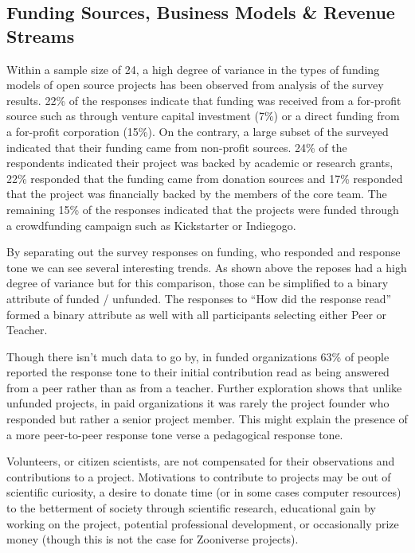 \subsection{Funding Sources, Business Models \& Revenue Streams}

Within a sample size of 24, a high degree of variance in the types of funding models of open source projects has been observed from analysis of the survey results. 22\% of the responses indicate that funding was received from a for-profit source such as through venture capital investment (7\%) or a direct funding from a for-profit corporation (15\%). On the contrary, a large subset of the surveyed indicated that their funding came from non-profit sources. 24\% of the respondents indicated their project was backed by academic or research grants, 22\% responded that the funding came from donation sources and 17\% responded that the project was financially backed by the members of the core team. The remaining 15\% of the responses indicated that the projects were funded through a crowdfunding campaign such as Kickstarter or Indiegogo.




By separating out the survey responses on funding, who responded and response tone we can see several interesting trends. As shown above the reposes had a high degree of variance but for this comparison, those can be simplified to a binary attribute of funded / unfunded. The responses to “How did the response read” formed a binary attribute as well with all participants selecting either Peer or Teacher.

Though there isn't much data to go by, in funded organizations 63\% of people reported the response tone to their initial contribution read as being answered from a peer rather than as from a teacher. Further exploration shows that unlike unfunded projects, in paid organizations it was rarely the project founder who responded but rather a senior project member. This might explain the presence of a more peer-to-peer response tone verse a pedagogical response tone.


Volunteers, or citizen scientists, are not compensated for their observations and contributions to a project. Motivations to contribute to projects may be out of scientific curiosity, a desire to donate time (or in some cases computer resources) to the betterment of society through scientific research, educational gain by working on the project, potential professional development, or occasionally prize money (though this is not the case for Zooniverse projects).
 

